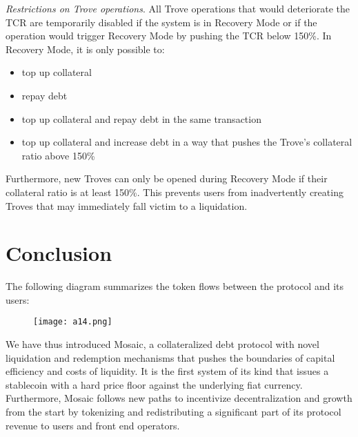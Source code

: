 \documentclass{article}
\begin{document}
\textit{Restrictions on Trove operations}. All Trove operations that would deteriorate the TCR are temporarily disabled if the system is in Recovery Mode or if the operation would trigger Recovery Mode by pushing the TCR below 150\%. In Recovery Mode, it is only possible to:
\begin{itemize}
    \item top up collateral
    \item repay debt
    \item top up collateral and repay debt in the same transaction 
    \item top up collateral and increase debt in a way that pushes the Trove's collateral ratio above 150\%
\end{itemize}

Furthermore, new Troves can only be opened during Recovery Mode if their collateral ratio is at least 150\%. This prevents users from inadvertently creating Troves that may immediately fall victim to a liquidation.

\section{Conclusion}
The following diagram summarizes the token flows between the protocol and its users:\\

\begin{figure}[ht]
\centering
\texttt{[image: a14.png]}
\end{figure}

We have thus introduced Mosaic, a collateralized debt protocol with novel liquidation and redemption mechanisms that pushes the boundaries of capital efficiency and costs of liquidity. It is the first system of its kind that issues a stablecoin with a hard price floor against the underlying fiat currency. Furthermore, Mosaic follows new paths to incentivize decentralization and growth from the start by tokenizing and redistributing a significant part of its protocol revenue to users and front end operators. 
\end{document}

